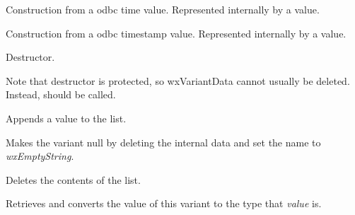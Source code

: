 
Construction from a odbc time value.  Represented internally by a  value.


Construction from a odbc timestamp value.  Represented internally by a  value.

\label{wxvariantdtor}


Destructor.

Note that destructor is protected, so wxVariantData cannot usually
be deleted. Instead,  should be called.


\label{wxvariantappend}


Appends a value to the list.

\label{wxvariantclear}


Makes the variant null by deleting the internal data and
set the name to {\it wxEmptyString}.

\label{wxvariantclearlist}


Deletes the contents of the list.


\label{wxvariantconvert}







Retrieves and converts the value of this variant to the type that {\it value} is.


\label{wxvariantgetcount}

